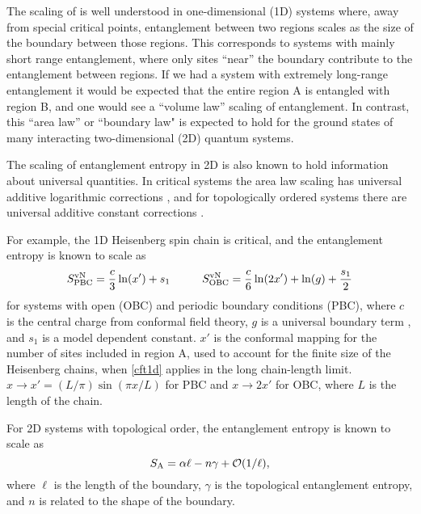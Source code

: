 The scaling of \vn is well understood in one-dimensional (1D) systems \cite{ALreview} where, away from special critical points, entanglement between two regions scales as the size of the boundary between those regions.
This corresponds to systems with mainly short range entanglement, where only sites ``near'' the boundary contribute to the entanglement between regions.  
If we had a system with extremely long-range entanglement it would be expected that the entire region A is entangled with region B, and one would see a ``volume law'' scaling of entanglement. 
In contrast, this ``area law'' or ``boundary law" \cite{Shredder} is expected to hold for the ground states of many interacting two-dimensional (2D) quantum systems.



The scaling of entanglement entropy in 2D is also known to hold information about universal quantities.
In critical systems the area law scaling has universal additive logarithmic corrections \cite{Casini2007,Ryu}, and for topologically ordered systems there are universal additive constant corrections \cite{KP,LW}.

For example, the 1D Heisenberg spin chain is critical, and the entanglement entropy is known to scale as \cite{Cardy, Ian1, Zhou2006}
\begin{equation} \label{cft1d} 
	S^{\text{vN}}_{\text{PBC}} = \frac{c}{3}\ln(x') + s_1
	\hspace{1cm}
	S^{\text{vN}}_{\text{OBC}} = \frac{c}{6}\ln(2x') + \ln(g)+ \frac{s_1}{2}
\end{equation}
for systems with open (OBC) and periodic boundary conditions (PBC), where $c$ is the central charge from conformal field theory, $g$ is a universal boundary term \cite{AffleckAndLudwig}, and $s_1$ is a model dependent constant. $x'$ is the conformal mapping for the number of sites included in region A, used to account for the finite size of the Heisenberg chains, when \eqref{cft1d} applies in the long chain-length limit.  $x \rightarrow x' = (L/\pi)\sin(\pi x/L)$ for PBC and $x \rightarrow 2x'$ for OBC, where $L$ is the length of the chain.

For 2D systems with topological order, the entanglement entropy is known to scale as \cite{intro}
\begin{equation} \label{AL}
S_{\rm A} = \alpha \ell - n \gamma + \mathcal{O}(1/\ell),
\end{equation}
where $\ell$ is the length of the boundary, $\gamma$ is the topological entanglement entropy, and $n$ is related to the shape of the boundary.

